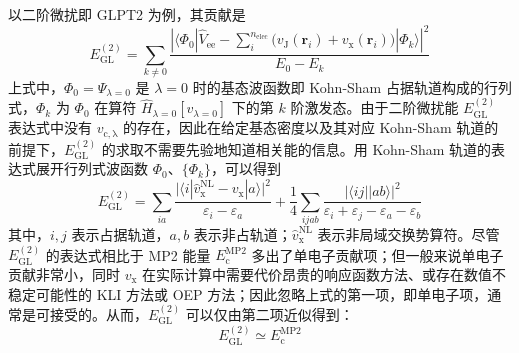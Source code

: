 以二阶微扰即 GLPT2 为例，其贡献是
\begin{equation}
  E_\mathrm{GL}^{(2)} = \sum_{k \neq 0} \frac{\displaystyle \left| \langle \Phi_0 | \hat V_\mathrm{ee} - \sum_i^{n_\mathrm{elec}} \big( v_\mathrm{J} (\bm{r}_i) + v_\mathrm{x} (\bm{r}_i) \big) | \Phi_k \rangle \right|^2}{E_0 - E_k}
\end{equation}
上式中，$\Phi_{0} = \Psi_{\lambda=0}$ 是 $\lambda = 0$ 时的基态波函数即 Kohn-Sham 占据轨道构成的行列式，$\Phi_{k}$ 为 $\Phi_{0}$ 在算符 $\hat H_{\lambda=0} [v_{\lambda=0}]$ 下的第 $k$ 阶激发态。由于二阶微扰能 $E_\mathrm{GL}^{(2)}$ 表达式中没有 $v_\mathrm{c, \lambda}$ 的存在，因此在给定基态密度以及其对应 Kohn-Sham 轨道的前提下，$E_\mathrm{GL}^{(2)}$ 的求取不需要先验地知道相关能的信息。用 Kohn-Sham 轨道的表达式展开行列式波函数 $\Phi_0$、$\{\Phi_k\}$，可以得到
\begin{equation}
  E_\mathrm{GL}^{(2)} = \sum_{ia} \frac{\big| \langle i | \hat v_\mathrm{x}^\mathrm{NL} - v_\mathrm{x} | a \rangle \big|^2}{\varepsilon_i - \varepsilon_a} + \frac{1}{4} \sum_{ijab} \frac{\big| \langle ij || ab \rangle \big|^2}{\varepsilon_i + \varepsilon_j - \varepsilon_a - \varepsilon_b}
\end{equation}
其中，$i, j$ 表示占据轨道，$a, b$ 表示非占轨道；$\hat v_\mathrm{x}^\mathrm{NL}$ 表示非局域交换势算符。尽管 $E_\mathrm{GL}^{(2)}$ 的表达式相比于 MP2 能量 $E_\mathrm{c}^\mathrm{MP2}$ 多出了单电子贡献项；但一般来说单电子贡献非常小\cite{DellaSala-Goerling.JCP.2001}，同时 $v_\mathrm{x}$ 在实际计算中需要代价昂贵的响应函数方法\cite{Goerling-Goerling.PRL.1999}、或存在数值不稳定可能性的 KLI 方法\cite{Krieger-Iafrate.PRA.1992, DellaSala-Goerling.JCP.2001}或 OEP 方法\cite{Mori-Sanchez-Yang.JCP.2005}；因此忽略上式的第一项，即单电子项，通常是可接受的。从而，$E_\mathrm{GL}^{(2)}$ 可以仅由第二项近似得到：
\begin{equation}
  E_\mathrm{GL}^{(2)} \simeq E_\mathrm{c}^\mathrm{MP2}
\end{equation}

